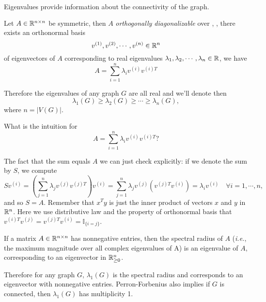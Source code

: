 \begin{remark}
Eigenvalues provide information about the connectivity of the graph.
\end{remark}


\begin{theorem}
\label{thm1.1}
Let \(A\in\mathbb{R}^{n\times n}\) be symmetric, then \(A\) \emph{orthogonally diagonalizable} over \R, ,
there exists an orthonormal basis
\[ v^{(1)}, v^{(2)},\cdots,v^{(n)}\in\mathbb{R}^n \]
of eigenvectors of \(A\) corresponding to real eigenvalues \(\lambda_1,\lambda_2,\cdots,\lambda_n\in\mathbb{R}\), we have
\[A=\sum_{i=1}^{n}\lambda_i v^{(i)}v^{(i)T} \]
\end{theorem}

Therefore the eigenvalues of any graph \(G\) are all real and we'll denote then
\[ \lambda_1(G)\geq\lambda_2(G)\geq\cdots\geq\lambda_n(G), \]
where \(n=|V(G)|\).

\begin{question}
What is the intuition for
\[A=\sum_{i=1}^{n}\lambda_i v^{(i)}v^{(i)T} ? \]
\end{question}
\begin{answer}
The fact that the sum equals \(A\) we can just check explicitly:
if we denote the sum by \(S\), we compute 
\[S v^{(i)} = \left(\sum_{j=1}^{n}\lambda_j v^{(j)}v^{(j)T}\right)v^{(i)} = \sum_{j=1}^{n}\lambda_j v^{(j)}\left(v^{(j)T}v^{(i)}\right) = \lambda_i v^{(i)} \quad \forall i=1,\cdots,n,\]
and so \(S = A\).
Remember that \(x^Ty\) is just the inner product of vectors \(x\) and \(y\) in \(\mathbb{R}^n\).
Here we use distributive law and the property of orthonormal basis that \(v^{(i)T}v^{(j)}=v^{(j)T}v^{(i)}=\mathbb{I}_{\{i=j\}}\).
\end{answer}



\begin{theorem}
If a matrix \(A\in\mathbb{R}^{n\times n}\) has nonnegative entries, then the spectral radius of \(A\) (\textit{i.e.}, the maximum magnitude over all complex eigenvalues of A) is an eigenvalue of \(A\), corresponding to an eigenvector in \(\mathbb{R}_{\ge0}^n\).
\end{theorem}
Therefore for any graph \(G\), \(\lambda_1(G)\) is the spectral radius and corresponds to an eigenvector with nonnegative entries.
Perron-Forbenius also implies if \(G\) is connected, then \(\lambda_1(G)\) has multiplicity 1.


